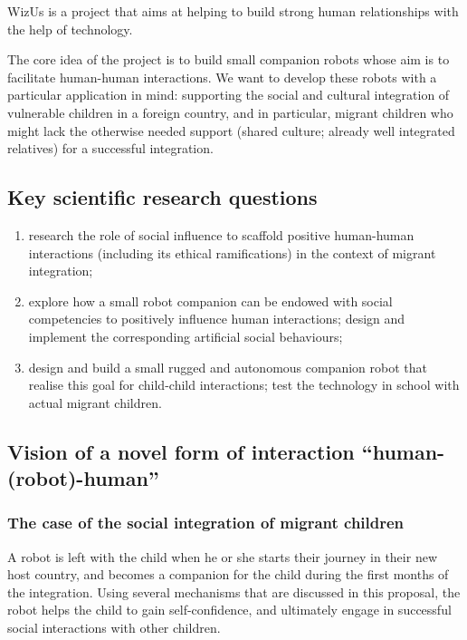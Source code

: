 \documentclass[11pt]{report}
\newcommand{\project}{WizUs\xspace}
\begin{document}
\project is a project that aims at helping to build strong human
relationships with the help of technology.

The core idea of the project is to build small companion robots whose
aim is to facilitate human-human interactions. We want to develop these
robots with a particular application in mind: supporting the social and
cultural integration of vulnerable children in a foreign country, and in
particular, migrant children who might lack the otherwise needed support
(shared culture; already well integrated relatives) for a successful
integration.

\subsection{Key scientific research questions}

\begin{enumerate}
\item research the role of social influence to scaffold positive human-human
    interactions (including its ethical ramifications) in the context of migrant
    integration;
\item explore how a small robot companion can be endowed with social
    competencies to positively influence human interactions; design and
    implement the corresponding artificial social behaviours;
\item design and build a small rugged and autonomous companion robot that
    realise this goal for child-child interactions; test the technology in
    school with actual migrant children.
\end{enumerate}

\subsection{Vision of a novel form of interaction ``human-(robot)-human''}

\subsubsection{The case of the social integration of migrant children}

A robot is left with the child when he or she starts their journey in
their new host country, and becomes a companion for the child during the
first months of the integration. Using several mechanisms that are
discussed in this proposal, the robot helps the child to gain
self-confidence, and ultimately engage in successful social interactions
with other children.
\end{document}

